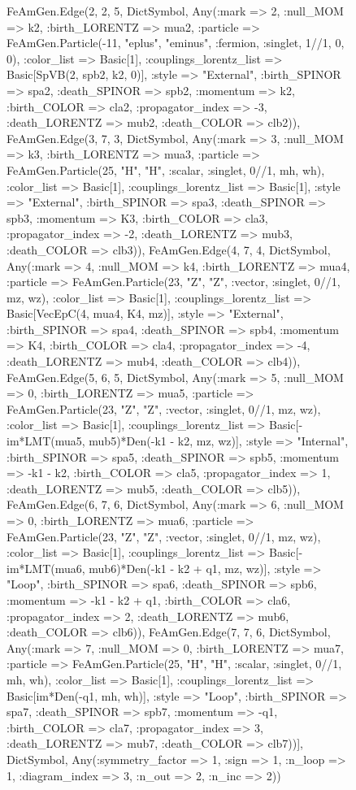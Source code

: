 \documentclass{revtex4}
\begin{document}
\begin{figure}[!htb]
\begin{center}
{FeAmGen.Edge(2, 2, 5, Dict{Symbol, Any}(:mark => 2, :null_MOM => k2, :birth_LORENTZ => mua2, :particle => FeAmGen.Particle(-11, "eplus", "eminus", :fermion, :singlet, 1//1, 0, 0), :color_list => Basic[1], :couplings_lorentz_list => Basic[SpVB(2, spb2, k2, 0)], :style => "External", :birth_SPINOR => spa2, :death_SPINOR => spb2, :momentum => k2, :birth_COLOR => cla2, :propagator_index => -3, :death_LORENTZ => mub2, :death_COLOR => clb2)), FeAmGen.Edge(3, 7, 3, Dict{Symbol, Any}(:mark => 3, :null_MOM => k3, :birth_LORENTZ => mua3, :particle => FeAmGen.Particle(25, "H", "H", :scalar, :singlet, 0//1, mh, wh), :color_list => Basic[1], :couplings_lorentz_list => Basic[1], :style => "External", :birth_SPINOR => spa3, :death_SPINOR => spb3, :momentum => K3, :birth_COLOR => cla3, :propagator_index => -2, :death_LORENTZ => mub3, :death_COLOR => clb3)), FeAmGen.Edge(4, 7, 4, Dict{Symbol, Any}(:mark => 4, :null_MOM => k4, :birth_LORENTZ => mua4, :particle => FeAmGen.Particle(23, "Z", "Z", :vector, :singlet, 0//1, mz, wz), :color_list => Basic[1], :couplings_lorentz_list => Basic[VecEpC(4, mua4, K4, mz)], :style => "External", :birth_SPINOR => spa4, :death_SPINOR => spb4, :momentum => K4, :birth_COLOR => cla4, :propagator_index => -4, :death_LORENTZ => mub4, :death_COLOR => clb4)), FeAmGen.Edge(5, 6, 5, Dict{Symbol, Any}(:mark => 5, :null_MOM => 0, :birth_LORENTZ => mua5, :particle => FeAmGen.Particle(23, "Z", "Z", :vector, :singlet, 0//1, mz, wz), :color_list => Basic[1], :couplings_lorentz_list => Basic[-im*LMT(mua5, mub5)*Den(-k1 - k2, mz, wz)], :style => "Internal", :birth_SPINOR => spa5, :death_SPINOR => spb5, :momentum => -k1 - k2, :birth_COLOR => cla5, :propagator_index => 1, :death_LORENTZ => mub5, :death_COLOR => clb5)), FeAmGen.Edge(6, 7, 6, Dict{Symbol, Any}(:mark => 6, :null_MOM => 0, :birth_LORENTZ => mua6, :particle => FeAmGen.Particle(23, "Z", "Z", :vector, :singlet, 0//1, mz, wz), :color_list => Basic[1], :couplings_lorentz_list => Basic[-im*LMT(mua6, mub6)*Den(-k1 - k2 + q1, mz, wz)], :style => "Loop", :birth_SPINOR => spa6, :death_SPINOR => spb6, :momentum => -k1 - k2 + q1, :birth_COLOR => cla6, :propagator_index => 2, :death_LORENTZ => mub6, :death_COLOR => clb6)), FeAmGen.Edge(7, 7, 6, Dict{Symbol, Any}(:mark => 7, :null_MOM => 0, :birth_LORENTZ => mua7, :particle => FeAmGen.Particle(25, "H", "H", :scalar, :singlet, 0//1, mh, wh), :color_list => Basic[1], :couplings_lorentz_list => Basic[im*Den(-q1, mh, wh)], :style => "Loop", :birth_SPINOR => spa7, :death_SPINOR => spb7, :momentum => -q1, :birth_COLOR => cla7, :propagator_index => 3, :death_LORENTZ => mub7, :death_COLOR => clb7))], Dict{Symbol, Any}(:symmetry_factor => 1, :sign => 1, :n_loop => 1, :diagram_index => 3, :n_out => 2, :n_inc => 2)) 
}
\end{center}
\end{figure}
\end{document}
